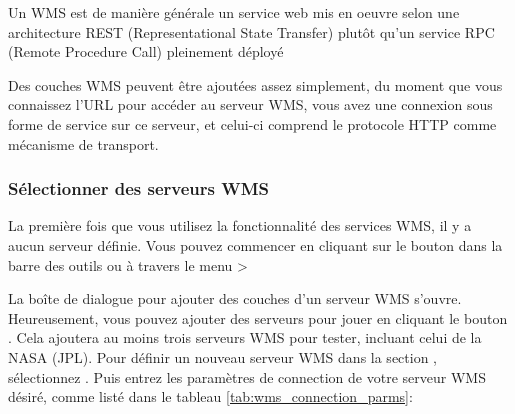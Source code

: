 Un WMS est de manière générale un service web mis en oeuvre selon une 
architecture REST (Representational State Transfer) plutôt qu'un service 
  RPC (Remote Procedure Call) pleinement déployé

Des couches WMS peuvent être ajoutées assez simplement, du moment que vous
connaissez l'URL pour accéder au serveur WMS, vous avez une connexion sous
forme de service sur ce serveur, et celui-ci comprend le protocole HTTP comme
mécanisme de transport.

\subsubsection{Sélectionner des serveurs
WMS}\label{sec:ogc-wms-servers}

La première fois que vous utilisez la fonctionnalité des services WMS, il y a
aucun serveur définie. Vous pouvez commencer en cliquant sur le bouton
 dans la barre des
outils ou à travers le menu
>

La boîte de dialogue  pour ajouter des
couches d'un serveur WMS s'ouvre. Heureusement, vous pouvez ajouter des
serveurs pour jouer en cliquant le bouton . Cela ajoutera au moins trois serveurs WMS pour tester, incluant celui
de la NASA (JPL). Pour définir un nouveau serveur WMS dans la section
, sélectionnez . Puis entrez les
paramètres de connection de votre serveur WMS désiré, comme listé dans le
tableau \ref{tab:wms_connection_parms}:

